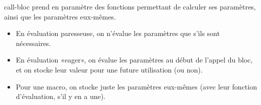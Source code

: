 \documentclass{article}
\begin{document}
call-bloc prend en paramètre des fonctions permettant de calculer ses paramètres, ainsi que les paramètres eux-mêmes.
\begin{itemize}
\item En évaluation paresseuse, on n'évalue les paramètres que s'ils sont nécessaires.
\item En évaluation «eager», on évalue les paramètres au début de l'appel du bloc, et on stocke leur valeur pour une future utilisation (ou non).
\item Pour une macro, on stocke juste les paramètres eux-mêmes (avec leur fonction d'évaluation, s'il y en a une).
\end{itemize}
\end{document}
